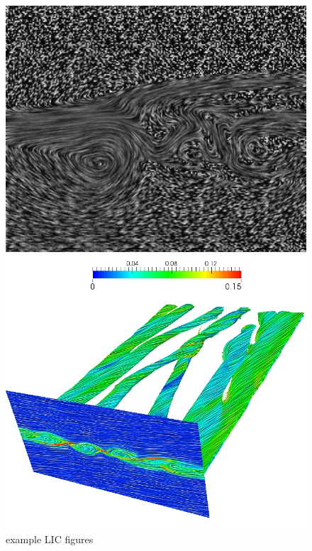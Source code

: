 \documentclass[a4paper,10pt]{article}
\begin{document}
\begin{figure}[ht]
 \centering
\begin{minipage}[c]{0.45\textwidth}
\includegraphics[width=\textwidth]{asym-2d-bw-no-norm.png}
\end{minipage}\hspace{0.1in}
\begin{minipage}[c]{0.45\textwidth}
\includegraphics[width=\textwidth]{flux-ropes.png}
\end{minipage}
 \caption{example LIC figures}
 \label{fig:LIC}
\end{figure}
\end{document}
